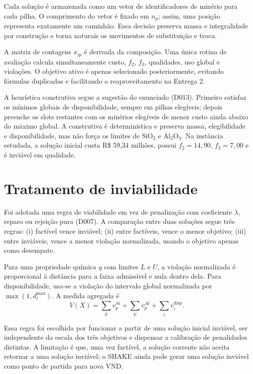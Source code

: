 \documentclass[10pt,twocolumn,a4paper]{article}
\begin{document}
Cada solução é armazenada como um vetor de identificadores de minério para cada pilha. O comprimento do vetor é fixado em $n_p$; assim, uma posição representa exatamente um caminhão. Essa decisão preserva massa e integralidade por construção e torna naturais os movimentos de substituição e troca.

A matriz de contagens $x_{ip}$ é derivada da composição. Uma única rotina de avaliação calcula simultaneamente custo, $f_2$, $f_3$, qualidades, uso global e violações. O objetivo ativo é apenas selecionado posteriormente, evitando fórmulas duplicadas e facilitando o reaproveitamento na Entrega 2.

A heurística construtiva segue a sugestão do enunciado (D013). Primeiro satisfaz os mínimos globais de disponibilidade, sempre em pilhas elegíveis; depois preenche os slots restantes com os minérios elegíveis de menor custo ainda abaixo do máximo global. A construtiva é determinística e preserva massa, elegibilidade e disponibilidade, mas não força os limites de $\text{SiO}_2$ e $\text{Al}_2\text{O}_3$. Na instância estudada, a solução inicial custa R\$ 59,34 milhões, possui $f_2 = 14,90$, $f_3 = 7,00$ e é inviável em qualidade.

\section{Tratamento de inviabilidade}
\label{sec:inviabilidade}

Foi adotada uma regra de viabilidade em vez de penalização com coeficiente $\lambda$, reparo ou rejeição pura (D007). A comparação entre duas soluções segue três regras: (i) factível vence inviável; (ii) entre factíveis, vence o menor objetivo; (iii) entre inviáveis, vence a menor violação normalizada, usando o objetivo apenas como desempate.

Para uma propriedade química $q$ com limites $L$ e $U$, a violação normalizada é proporcional à distância para a faixa admissível e nula dentro dela. Para disponibilidade, usa-se a violação do intervalo global normalizada por $\max(1, d_i^{\max})$. A medida agregada é
\begin{equation}
V(X) = \sum_{p} v_p^{Si} + \sum_{p} v_p^{Al} + \sum_{i} v_i^{\text{disp}}.
\end{equation}

Essa regra foi escolhida por funcionar a partir de uma solução inicial inviável, ser independente da escala dos três objetivos e dispensar a calibração de penalidades distintas. A limitação é que, uma vez factível, a solução corrente não aceita retornar a uma solução inviável; o SHAKE ainda pode gerar uma solução inviável como ponto de partida para nova VND.
\end{document}
